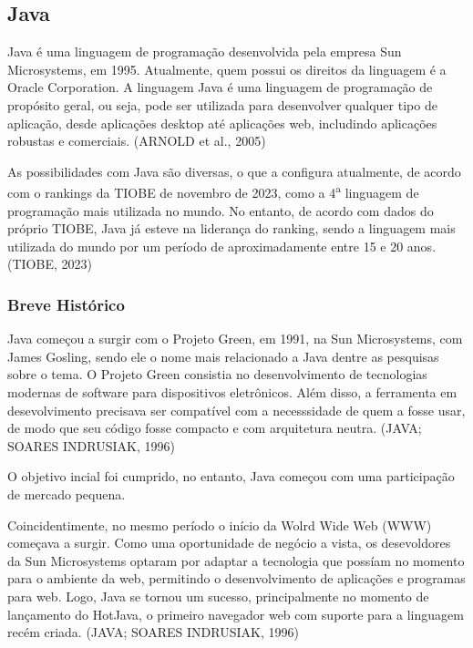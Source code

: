 \documentclass[a4paper,12pt]{article}
\begin{document}
\subsection{Java}
Java é uma linguagem de programação desenvolvida pela empresa Sun Microsystems, em 1995. Atualmente, quem possui os direitos da 
linguagem é a Oracle Corporation. A linguagem Java é uma linguagem de programação de propósito geral, ou seja, pode ser utilizada 
para desenvolver qualquer tipo de aplicação, desde aplicações desktop até aplicações web, includindo aplicações robustas e comerciais. (ARNOLD et al., 2005)

As possibilidades com Java são diversas, o que a configura atualmente, de acordo com o rankings da TIOBE de novembro de 2023, como a 4\textsuperscript{a} linguagem de programação
mais utilizada no mundo. No entanto, de acordo com dados do próprio TIOBE, Java já esteve na liderança do ranking, sendo a linguagem mais utilizada do mundo
por um período de aproximadamente entre 15 e 20 anos. (TIOBE, 2023)

\subsubsection{Breve Histórico}
Java começou a surgir com o Projeto Green, em 1991, na Sun Microsystems, com James Gosling, sendo ele o nome mais relacionado a Java dentre as pesquisas 
sobre o tema. O Projeto Green consistia no desenvolvimento de tecnologias modernas de software para dispositivos eletrônicos. Além disso, a ferramenta
em desevolvimento precisava ser compatível com a necesssidade de quem a fosse usar, de modo que seu código fosse compacto e com arquitetura neutra. (JAVA; SOARES INDRUSIAK, 1996)

O objetivo incial foi cumprido, no entanto, Java começou com uma participação de mercado pequena. 

Coincidentimente, no mesmo período o início da Wolrd Wide Web (WWW) começava a surgir. Como uma oportunidade de negócio a vista, os desevoldores da Sun
Microsystems optaram por adaptar a tecnologia que possíam no momento para o ambiente da web, permitindo o desenvolvimento de aplicações e programas para web.
Logo, Java se tornou um sucesso, principalmente no momento de lançamento do HotJava, o primeiro navegador web com suporte para a linguagem recém criada. (JAVA; SOARES INDRUSIAK, 1996)
\end{document}
